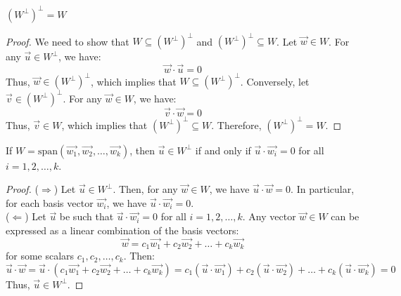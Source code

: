 \begin{theorem}
    $(W^{\perp})^{\perp} = W$
\end{theorem}
\begin{proof}
    We need to show that $W \subseteq (W^{\perp})^{\perp}$ and $(W^{\perp})^{\perp} \subseteq W$.
    Let $\vec{w} \in W$. For any $\vec{u} \in W^{\perp}$, we have:
    \[
        \vec{w} \cdot \vec{u} = 0
    \]
    Thus, $\vec{w} \in (W^{\perp})^{\perp}$, which implies that $W \subseteq (W^{\perp})^{\perp}$.
    Conversely, let $\vec{v} \in (W^{\perp})^{\perp}$. For any $\vec{w} \in W$, we have:
    \[
        \vec{v} \cdot \vec{w} = 0
    \]
    Thus, $\vec{v} \in W$, which implies that $(W^{\perp})^{\perp} \subseteq W$.
    Therefore, $(W^{\perp})^{\perp} = W$.
\end{proof}

\begin{theorem}
    If $W = \text{span}(\vec{w_1}, \vec{w_2}, \ldots, \vec{w_k})$, then $\vec{u} \in W^{\perp}$ if and only if $\vec{u} \cdot \vec{w_i} = 0$ for all $i = 1, 2, \ldots, k$.
\end{theorem}
\begin{proof}
    ($\Rightarrow$) Let $\vec{u} \in W^{\perp}$. Then, for any $\vec{w} \in W$, we have $\vec{u} \cdot \vec{w} = 0$. In particular, for each basis vector $\vec{w_i}$, we have $\vec{u} \cdot \vec{w_i} = 0$. \\
    ($\Leftarrow$) Let $\vec{u}$ be such that $\vec{u} \cdot \vec{w_i} = 0$ for all $i = 1, 2, \ldots, k$. Any vector $\vec{w} \in W$ can be expressed as a linear combination of the basis vectors:
    \[
        \vec{w} = c_1 \vec{w_1} + c_2 \vec{w_2} + \ldots + c_k \vec{w_k}
    \]
    for some scalars $c_1, c_2, \ldots, c_k$. Then:
    \[
        \vec{u} \cdot \vec{w} = \vec{u} \cdot (c_1 \vec{w_1} + c_2 \vec{w_2} + \ldots + c_k \vec{w_k}) = c_1 (\vec{u} \cdot \vec{w_1}) + c_2 (\vec{u} \cdot \vec{w_2}) + \ldots + c_k (\vec{u} \cdot \vec{w_k}) = 0
    \]
    Thus, $\vec{u} \in W^{\perp}$.
\end{proof}

